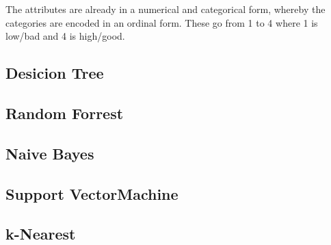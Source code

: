 \documentclass[paper=a4, fontsize=11pt]{scrartcl} %
\numberwithin{equation}{section} %
\numberwithin{figure}{section} %
\numberwithin{table}{section} %
\begin{document}
The attributes are already in a numerical and categorical form, whereby the categories are encoded in an ordinal form. These go from 1 to 4 where 1 is low/bad and 4 is high/good.



\subsection{Desicion Tree}
\subsection{Random Forrest}
\subsection{Naive Bayes}
\subsection{Support VectorMachine}
\subsection{k-Nearest}




\end{document}
